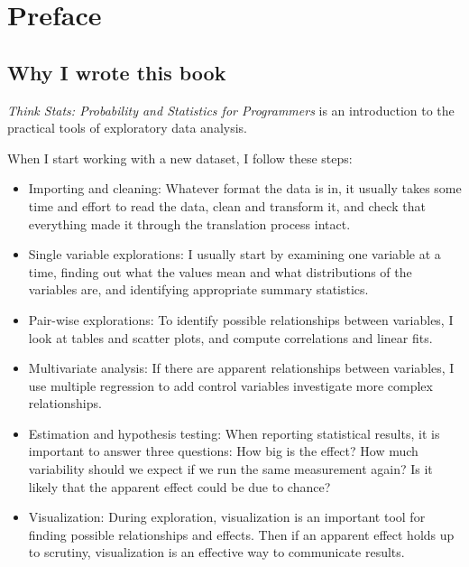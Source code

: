 \documentclass[12pt]{book}
\begin{document}
\fi

\chapter{Preface}
\label{preface}

\section*{Why I wrote this book}

{\em Think Stats: Probability and Statistics for Programmers} is an
introduction to the practical tools of exploratory data analysis.

When I start working with a new dataset, I follow these steps:

\begin{itemize}

\item Importing and cleaning: Whatever format the data is in, it
usually takes some time and effort to read the data, clean and transform
it, and check that everything made it through the translation process
intact.

\item Single variable explorations: I usually start by examining one
  variable at a time, finding out what the values mean and what
  distributions of the variables are, and identifying appropriate
  summary statistics.

\item Pair-wise explorations: To identify possible relationships
  between variables, I look at tables and scatter plots, and compute
  correlations and linear fits.

\item Multivariate analysis: If there are apparent relationships
  between variables, I use multiple regression to add control variables
  investigate more complex relationships.

\item Estimation and hypothesis testing: When reporting statistical
  results, it is important to answer three questions: How big is
  the effect?  How much variability should we expect if we run the same
  measurement again?  Is it likely that the apparent effect could be
  due to chance?

\item Visualization: During exploration, visualization is an important 
  tool for finding possible relationships and effects.  Then if an
  apparent effect holds up to scrutiny, visualization is an effective
  way to communicate results.

\end{itemize}
\end{document}
